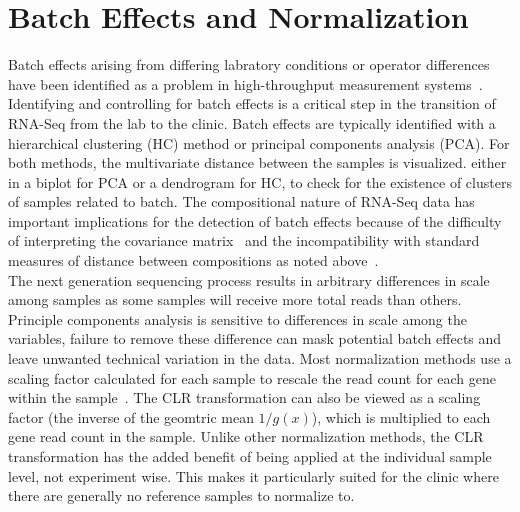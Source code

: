\documentclass{article}\usepackage[]{graphicx}\usepackage[]{color}
\theoremstyle{definition}
\begin{document}
\section{Batch Effects and Normalization}
Batch effects arising from differing labratory conditions or operator differences have been identified as a problem in high-throughput measurement systems~\cite{leek2010, chen2011}.  Identifying and controlling for batch effects is a critical step in the transition of RNA-Seq from the lab to the clinic.  Batch effects are typically identified with a hierarchical clustering (HC) method or principal components analysis (PCA).  For both methods, the multivariate distance between the samples is visualized. either in a biplot for PCA or a dendrogram for HC, to check for the existence of clusters of samples related to batch. %
The compositional nature of RNA-Seq data has important implications for the detection of batch effects because of the difficulty of interpreting the covariance matrix~\cite{Aitchison1986} and the incompatibility with standard measures of distance between compositions as noted above~\cite{Aitchison1986,Martin-Fernandez1998}.\\  %

The next generation sequencing process results in arbitrary differences in scale among samples as some samples will receive more total reads than others. Principle components analysis is sensitive to differences in scale among the variables, failure to remove these difference can mask potential batch effects and leave unwanted technical variation in the data.  Most normalization methods use a scaling factor calculated for each sample to rescale the read count for each gene within the sample~\cite{Dillies2013}.  The CLR transformation can also be viewed as a scaling factor (the inverse of the geomtric mean $1/g(x)$), which is multiplied to each gene read count in the sample.  Unlike other normalization methods, the CLR transformation has the added benefit of being applied at the individual sample level, not experiment wise.  This makes it particularly suited for the clinic where there are generally no reference samples to normalize to.\\
\end{document}
